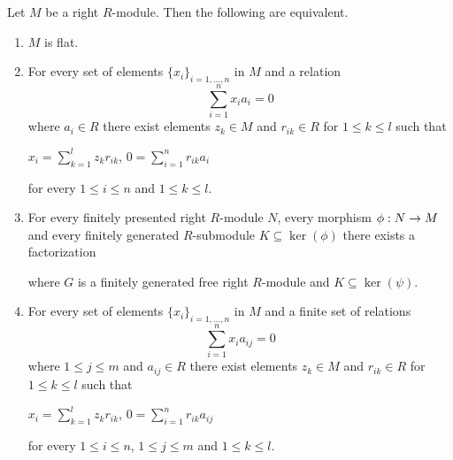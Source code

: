 \begin{theorem}\label{theorem:equationalcriteria}
Let $M$ be a right $R$-module. Then the following are equivalent.
\begin{enumerate}[label=\emph{\textbf{(\roman*)}}, leftmargin=1.5em]
\item $M$ is flat.
\item For every set of elements $\{x_i\}_{i=1,...,n}$ in $M$ and a relation
$$\sum^n_{i=1}x_ia_{i}=0$$
where $a_{i}\in R$ there exist elements $z_k\in M$ and $r_{ik}\in R$ for $1\leq k\leq l$ such that
\begin{center}
$x_i=\sum^l_{k=1}z_kr_{ik}$, $0=\sum^n_{i=1}r_{ik}a_{i}$
\end{center}
for every $1\leq i \leq n$ and $1\leq k\leq l$.
\item For every finitely presented right $R$-module $N$, every morphism $\phi:N\rightarrow M$ and every finitely generated $R$-submodule $K\subseteq \ker(\phi)$ there exists a factorization
\begin{center}
\end{center}
where $G$ is a finitely generated free right $R$-module and $K\subseteq \ker(\psi)$.
\item For every set of elements $\{x_i\}_{i=1,...,n}$ in $M$ and a finite set of relations
$$\sum^n_{i=1}x_ia_{ij}=0$$
where $1\leq j\leq m$ and $a_{ij}\in R$ there exist elements $z_k\in M$ and $r_{ik}\in R$ for $1\leq k\leq l$ such that
\begin{center}
$x_i=\sum^l_{k=1}z_kr_{ik}$, $0=\sum^n_{i=1}r_{ik}a_{ij}$
\end{center}
for every $1\leq i \leq n$, $1\leq j\leq m$ and $1\leq k\leq l$.
\end{enumerate}
\end{theorem}
